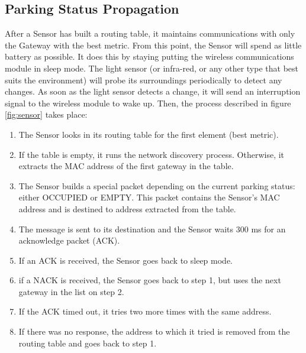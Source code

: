 \subsection{Parking Status Propagation}
\label{sec:parking_status_propagation}
After a Sensor has built a routing table, it maintains communications with only the Gateway with the best metric.
From this point, the Sensor will spend as little battery as possible.
It does this by staying putting the wireless communications module in sleep mode.
The light sensor (or infra-red, or any other type that best suits the environment) will probe its surroundings periodically to detect any changes.
As soon as the light sensor detects a change, it will send an interruption signal to the wireless module to wake up.
Then, the process described in figure \ref{fig:sensor} takes place:
\begin{enumerate}[noitemsep]
	\item The Sensor looks in its routing table for the first element (best metric).
	\item If the table is empty, it runs the network discovery process.
		Otherwise, it extracts the MAC address of the first gateway in the table.
	\item The Sensor builds a special packet depending on the current parking status: either OCCUPIED or EMPTY.
		This packet contains the Sensor's MAC address and is destined to address extracted from the table.
	\item The message is sent to its destination and the Sensor waits 300 ms for an acknowledge packet (ACK).
	\item If an ACK is received, the Sensor goes back to sleep mode.
	\item if a NACK is received, the Sensor goes back to step 1, but uses the next gateway in the list on step 2.
	\item If the ACK timed out, it tries two more times with the same address.
	\item If there was no response, the address to which it tried is removed from the routing table and goes back to step 1.
\end{enumerate}

